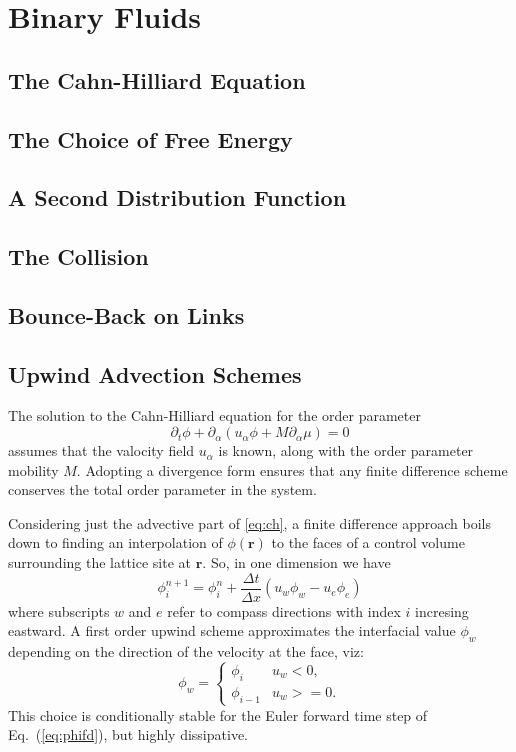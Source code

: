 \section{Binary Fluids}

\subsection{The Cahn-Hilliard Equation}

\subsection{The Choice of Free Energy}

\subsection{A Second Distribution Function}

\subsection{The Collision}

\subsection{Bounce-Back on Links}

\subsection{Upwind Advection Schemes}

The solution to the Cahn-Hilliard equation for the order parameter
\begin{equation}
\partial_t \phi + \partial_\alpha (u_\alpha \phi + M\partial_\alpha \mu) = 0
\label{eq:ch}
\end{equation}
assumes that the valocity field $u_\alpha$ is known, along with the
order parameter mobility $M$. Adopting a divergence form ensures that
any finite difference scheme conserves the total order parameter in
the system.

Considering just the advective part of \ref{eq:ch}, a finite difference
approach boils down to finding an interpolation of $\phi(\mathbf{r})$ to
the faces of a control volume surrounding the lattice site at $\mathbf{r}$.
So, in one dimension we have
\begin{equation}
\phi_i^{n+1} = \phi_i^n + \frac{\Delta t}{\Delta x} (u_w \phi_w - u_e \phi_e)
\label{eq:phifd}
\end{equation}
where subscripts $w$ and $e$ refer to compass directions with index $i$
incresing eastward. A first order upwind scheme approximates the
interfacial value $\phi_w$ depending on the direction of the velocity
at the face, viz:
\begin{equation}
\phi_w = \left\{
\begin{array}{ll} \phi_i & u_w < 0, \\ \phi_{i-1} & u_w >= 0.
\end{array} \right.
\end{equation}
This choice is conditionally stable for the Euler forward time step
of Eq.~(\ref{eq:phifd}), but highly dissipative.



